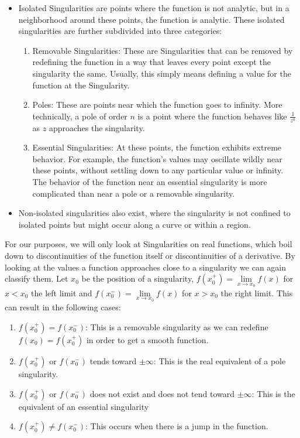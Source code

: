 \documentclass[journal]{IEEEtran}
\begin{document}
\begin{itemize}
    \item Isolated Singularities are points where the function is not analytic, but in a neighborhood around these points, the function is analytic. These isolated singularities are further subdivided into three categories:
    \begin{enumerate}
        \item Removable Singularities: These are Singularities that can be removed by redefining the function in a way that leaves every point except the singularity the same. Usually, this simply means defining a value for the function at the Singularity.

        \item Poles: These are points near which the function goes to infinity. More technically, a pole of order $n$ is a point where the function behaves like $\frac{1}{z^n}$ as $z$ approaches the singularity.

        \item Essential Singularities: At these points, the function exhibits extreme behavior. For example, the function's values may oscillate wildly near these points, without settling down to any particular value or infinity. The behavior of the function near an essential singularity is more complicated than near a pole or a removable singularity.
    \end{enumerate}
    \item Non-isolated singularities also exist, where the singularity is not confined to isolated points but might occur along a curve or within a region.
\end{itemize}

For our purposes, we will only look at Singularities on real functions, which boil down to discontinuities of the function itself or discontinuities of a derivative\cite[1]{ClassicalMechanicalSystems}.
By looking at the values a function approaches close to a singularity we can again classify them.
Let $x_0$ be the position of a singularity, $f(x_0^+) = \lim\limits_{x \to x_0}{f(x)}$ for $x < x_0$ the left limit and $f(x_0^-) = \lim\limits_{x \to x_0}{f(x)}$ for $x > x_0$ the right limit.
This can result in the following cases:
\begin{enumerate}
    \item $f(x_0^+) = f(x_0^-)$: This is a removable singularity as we can redefine $f(x_0) = f(x_0^+)$ in order to get a smooth function.
    \item $f(x_0^+)$ or $f(x_0^-)$ tends toward $\pm\infty$: This is the real equivalent of a pole singularity.
    \item $f(x_0^+)$ or $f(x_0^-)$ does not exist and does not tend toward $\pm\infty$: This is the equivalent of an essential singularity
    \item $f(x_0^+) \neq f(x_0^-)$: This occurs when there is a jump in the function.
\end{enumerate}
\end{document}
